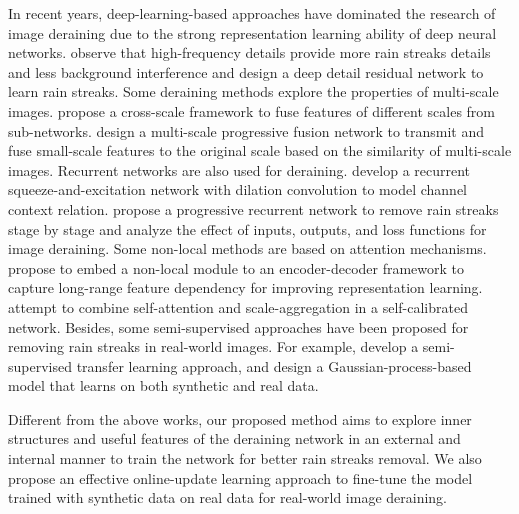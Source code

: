 \documentclass[letterpaper]{article} %
\begin{document}
In recent years, deep-learning-based approaches have dominated the research of image deraining due to the strong representation learning ability of deep neural networks.
\citet{derain_ddn_fu} observe that high-frequency details provide more rain streaks details and less background interference and design a deep detail residual network to learn rain streaks.
Some deraining methods explore the properties of multi-scale images. \citet{mm20_wang_dcsfn} propose a cross-scale framework to fuse features of different scales from sub-networks. \citet{cvpr20_jiang_mspfn} design a multi-scale progressive fusion network to transmit and fuse small-scale features to the original scale based on the similarity of multi-scale images.
Recurrent networks are also used for deraining.
\citet{derain_rescan_li} develop a recurrent squeeze-and-excitation network with dilation convolution to model channel context relation. \citet{derain_prenet_Ren_2019_CVPR} propose a progressive recurrent network to remove rain streaks stage by stage and analyze the effect of inputs, outputs, and loss functions for image deraining. Some non-local methods are based on attention mechanisms. \citet{derain_nledn_li} propose to embed a non-local module to an encoder-decoder framework to capture long-range feature dependency for improving representation learning. \citet{mm20_wang_jdnet} attempt to combine self-attention and scale-aggregation in a self-calibrated network.
Besides, some semi-supervised approaches have been proposed for removing rain streaks in real-world images.
For example, \citet{Derain-cvpr19-semi} develop a semi-supervised transfer learning approach, and \citet{cvpr20_syn2real} design a Gaussian-process-based model that learns on both synthetic and real data.

Different from the above works, our proposed method aims to explore inner structures and useful features of the deraining network in an external and internal manner to train the network for better rain streaks removal. We also propose an effective online-update learning approach to fine-tune the model trained with synthetic data on real data for real-world image deraining.
\end{document}
